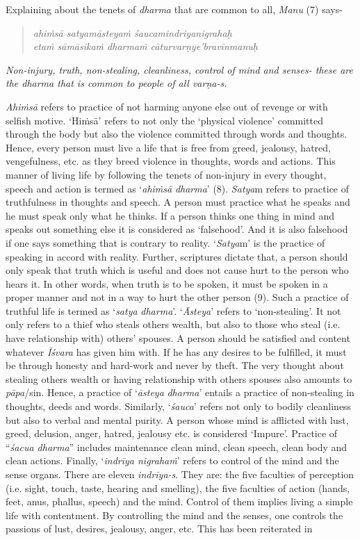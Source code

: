 Explaining about the tenets of \emph{dharma} that are common to all, \emph{Manu} (7) says-

\begin{verse}
\emph{ahiṁsā satyamāsteyaṁ śaucamindriyanigrahaḥ }\\
\emph{etaṁ sāmāsikaṁ dharmaṁ cāturvarṇye'bravīnmanuḥ }
\end{verse}

\emph{Non-injury, truth, non-stealing, cleanliness, control of mind and senses- these are the dharma that is common to people of all varṇa-s.}

\emph{Ahiṁsā} refers to practice of not harming anyone else out of revenge or with selfish motive. `Hiṁsā' refers to not only the `physical violence' committed through the body but also the violence committed through words and thoughts. Hence, every person must live a life that is free from greed, jealousy, hatred, vengefulness, etc. as they breed violence in thoughts, words and actions. This manner of living life by following the tenets of non-injury in every thought, speech and action is termed as `\emph{ahiṁsā} \emph{dharma}' (8). \emph{Satya}m refers to practice of truthfulness in thoughts and speech. A person must practice what he speaks and he must speak only what he thinks. If a person thinks one thing in mind and speaks out something else it is considered as `falsehood'. And it is also falsehood if one says something that is contrary to reality. `\emph{Satya}m' is the practice of speaking in accord with reality. Further, scriptures dictate that, a person should only speak that truth which is useful and does not cause hurt to the person who hears it. In other words, when truth is to be spoken, it must be spoken in a proper manner and not in a way to hurt the other person (9). Such a practice of truthful life is termed as `\emph{satya} \emph{dharma}'. `\emph{Āsteya}' refers to `non-stealing'. It not only refers to a thief who steals others wealth, but also to those who steal (i.e. have relationship with) others' spouses. A person should be satisfied and content whatever \emph{Īśvara} has given him with. If he has any desires to be fulfilled, it must be through honesty and hard-work and never by theft. The very thought about stealing others wealth or having relationship with others spouses also amounts to \emph{pāpa}/sin. Hence, a practice of `\emph{āsteya} \emph{dharma}' entails a practice of non-stealing in thoughts, deeds and words. Similarly, `\emph{śauca}' refers not only to bodily cleanliness but also to verbal and mental purity. A person whose mind is afflicted with lust, greed, delusion, anger, hatred, jealousy etc. is considered `Impure'. Practice of ``\emph{śacua dharma}'' includes maintenance clean mind, clean speech, clean body and clean actions. Finally, `\emph{indrīya nigrahaṁ}' refers to control of the mind and the sense organs. There are eleven \emph{indrīya-s}. They are: the five faculties of perception (i.e. sight, touch, taste, hearing and smelling), the five faculties of action (hands, feet, anus, phallus, speech) and the mind. Control of them implies living a simple life with contentment. By controlling the mind and the senses, one controls the passions of lust, desires, jealousy, anger, etc. This has been reiterated in 